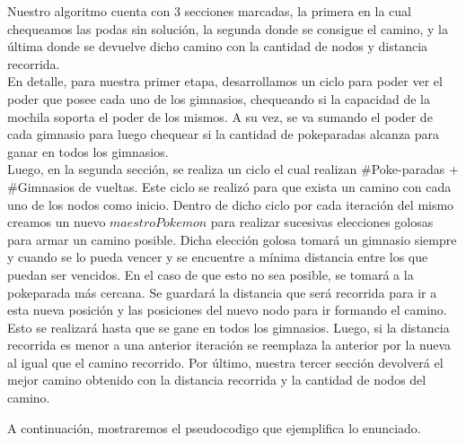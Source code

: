 Nuestro algoritmo cuenta con 3 secciones marcadas, la primera en la cual chequeamos las podas sin soluci\'on, la segunda donde se consigue el camino, y la \'ultima donde se devuelve dicho camino con la cantidad de nodos y distancia recorrida.\\
En detalle, para nuestra primer etapa, desarrollamos un ciclo para poder ver el poder que posee cada uno de los gimnasios, chequeando si la capacidad de la mochila soporta el poder de los mismos. A su vez, se va sumando el poder de cada gimnasio para luego chequear si la cantidad de pokeparadas alcanza para ganar en todos los gimnasios.\\
Luego, en la segunda secci\'on, se realiza un ciclo el cual realizan $\#$Poke-paradas + $\#$Gimnasios de vueltas. Este ciclo se realiz\'o para que exista un camino con cada uno de los nodos como inicio. Dentro de dicho ciclo por cada iteración del mismo creamos un nuevo $maestroPokemon$ para realizar sucesivas elecciones golosas para armar un camino posible. Dicha elecci\'on golosa tomar\'a un gimnasio siempre y cuando se lo pueda vencer y se encuentre a m\'inima distancia entre los que puedan ser vencidos. En el caso de que esto no sea posible, se tomar\'a a la pokeparada m\'as cercana. Se guardar\'a la distancia que ser\'a recorrida para ir a esta nueva posici\'on y las posiciones del nuevo nodo para ir formando el camino. Esto se realizar\'a hasta que se gane en todos los gimnasios. Luego, si la distancia recorrida es menor a una anterior iteraci\'on se reemplaza la anterior por la nueva al igual que el camino recorrido.
Por \'ultimo, nuestra tercer secci\'on devolver\'a el mejor camino obtenido con la distancia recorrida y la cantidad de nodos del camino.

A continuaci\'on, mostraremos el pseudocodigo que ejemplifica lo enunciado.

